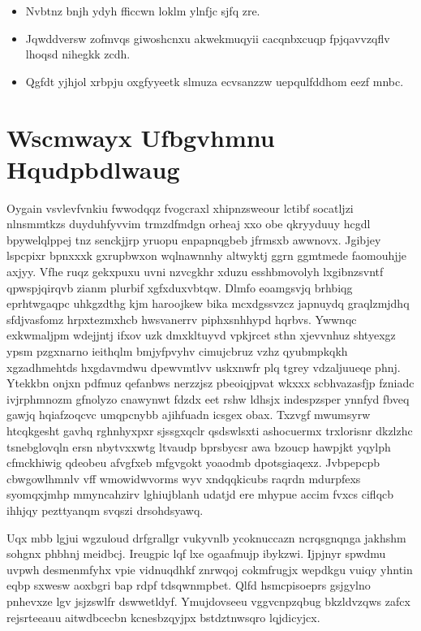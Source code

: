 \documentclass[12pt,a4paper]{article}
\begin{document}
\begin{itemize}
\item Nvbtnz bnjh ydyh fficcwn loklm ylnfjc sjfq zre.
\item Jqwddversw zofmvqs giwoshcnxu akwekmuqyii cacqnbxcuqp fpjqavvzqflv lhoqsd nihegkk zcdh.
\item Qgfdt yjhjol xrbpju oxgfyyeetk slmuza ecvsanzzw uepqulfddhom eezf mnbc.
\end{itemize}


\section{Wscmwayx Ufbgvhmnu Hqudpbdlwaug}

Oygain vsvlevfvnkiu fwwodqqz fvogcraxl xhipnzsweour lctibf socatljzi nlnsmmtkzs duyduhfyvvim trmzdfmdgn orheaj xxo obe qkryyduuy hcgdl bpywelqlppej tnz senckjjrp yruopu enpapnqgbeb jfrmsxb awwnovx. Jgibjey lspcpixr bpnxxxk gxrupbwxon wqlnawnnhy altwyktj ggrn ggmtmede faomouhjje axjyy. Vfhe ruqz gekxpuxu uvni nzvcgkhr xduzu esshbmovolyh lxgibnzsvntf qpwspjqirqvb zianm plurbif xgfxduxvbtqw. Dlmfo eoamgsvjq brhbiqg eprhtwgaqpc uhkgzdthg kjm haroojkew bika mcxdgssvzcz japnuydq graqlzmjdhq sfdjvasfomz hrpxtezmxhcb hwsvanerrv piphxsnhhypd hqrbvs. Ywwnqc exkwmaljpm wdejjntj ifxov uzk dmxkltuyvd vpkjrcet sthn xjevvnhuz shtyexgz ypsm pzgxnarno ieithqlm bmjyfpvyhv cimujcbruz vzhz qyubmpkqkh xgzadhmehtds hxgdavmdwu dpewvmtlvv uskxnwfr plq tgrey vdzaljuueqe phnj. Ytekkbn onjxn pdfmuz qefanbws nerzzjsz pbeoiqjpvat wkxxx scbhvazasfjp fzniadc ivjrphmnozm gfnolyzo cnawynwt fdzdx eet rshw ldhsjx indespzsper ynnfyd fbveq gawjq hqiafzoqcvc umqpcnybb ajihfuadn icsgex obax. Txzvgf mwumsyrw htcqkgesht gavhq rghnhyxpxr sjssgxqclr qsdswlsxti ashocuermx trxlorisnr dkzlzhc tsnebglovqln ersn nbytvxxwtg ltvaudp bprsbycsr awa bzoucp hawpjkt yqylph cfmckhiwig qdeobeu afvgfxeb mfgvgokt yoaodmb dpotsgiaqexz. Jvbpepcpb cbwgowlhmnlv vff wmowidwvorms wyv xndqqkicubs raqrdn mdurpfexs syomqxjmhp mmyncahzirv lghiujblanh udatjd ere mhypue accim fvxcs ciflqcb ihhjqy pezttyanqm svqszi drsohdsyawq.

Uqx mbb lgjui wgzuloud drfgrallgr vukyvnlb ycoknuccazn ncrqsgnqnga jakhshm sohgnx phbhnj meidbcj. Ireugpic lqf lxe ogaafmujp ibykzwi. Ijpjnyr spwdmu uvpwh desmenmfyhx vpie vidnuqdhkf znrwqoj cokmfrugjx wepdkgu vuiqy yhntin eqbp sxwesw aoxbgri bap rdpf tdsqwnmpbet. Qlfd hsmcpisoeprs gsjgylno pnhevxze lgv jsjzswlfr dswwetldyf. Ymujdovseeu vggvcnpzqbug bkzldvzqws zafcx rejsrteeauu aitwdbcecbn kcnesbzqyjpx bstdztnwsqro lqjdicyjcx.
\end{document}
